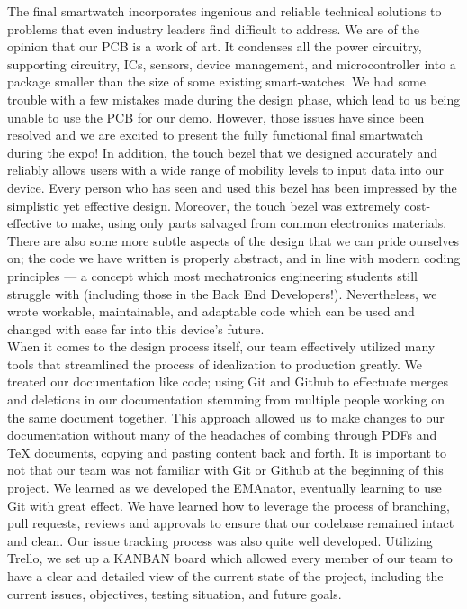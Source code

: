 \documentclass{article}
\begin{document}
The final smartwatch incorporates ingenious and reliable technical solutions to problems that even industry leaders find difficult to address. We are of the opinion that our PCB is a work of art. It condenses all the power circuitry, supporting circuitry, ICs, sensors, device management, and microcontroller into a package smaller than the size of some existing smart-watches. We had some trouble with a few mistakes made during the design phase, which lead to us being unable to use the PCB for our demo. However, those issues have since been resolved and we are excited to present the fully functional final smartwatch during the expo! In addition, the touch bezel that we designed accurately and reliably allows users with a wide range of mobility levels to input data into our device. Every person who has seen and used this bezel has been impressed by the simplistic yet effective design. Moreover, the touch bezel was extremely cost-effective to make, using only parts salvaged from common electronics materials. There are also some more subtle aspects of the design that we can pride ourselves on; the code we have written is properly abstract, and in line with modern coding principles — a concept which most mechatronics engineering students still struggle with (including those in the Back End Developers!). Nevertheless, we wrote workable, maintainable, and adaptable code which can be used and changed with ease far into this device's future.\\

When it comes to the design process itself, our team effectively utilized many tools that streamlined the process of idealization to production greatly. We treated our documentation like code; using Git and Github to effectuate merges and deletions in our documentation stemming from multiple people working on the same document together. This approach allowed us to make changes to our documentation without many of the headaches of combing through PDFs and TeX documents, copying and pasting content back and forth. It is important to not that our team was not familiar with Git or Github at the beginning of this project. We learned as we developed the EMAnator, eventually learning to use Git with great effect. We have learned how to leverage the process of branching, pull requests, reviews and approvals to ensure that our codebase remained intact and clean. Our issue tracking process was also quite well developed. Utilizing Trello, we set up a KANBAN board which allowed every member of our team to have a clear and detailed view of the current state of the project, including the current issues, objectives, testing situation, and future goals.\\
\end{document}

